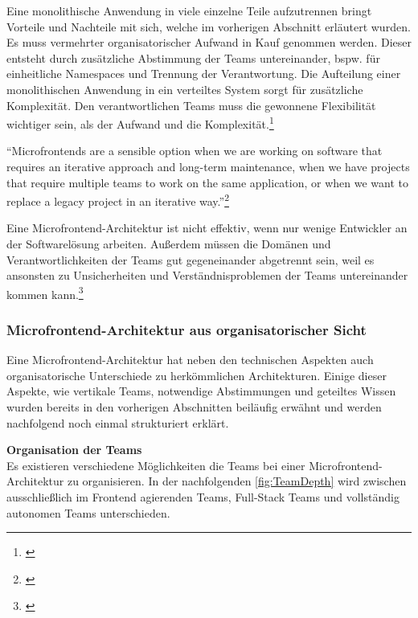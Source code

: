 Eine monolithische Anwendung in viele einzelne Teile aufzutrennen bringt Vorteile und Nachteile mit sich, welche im vorherigen Abschnitt erläutert wurden. Es muss vermehrter organisatorischer Aufwand in Kauf genommen werden. Dieser entsteht durch zusätzliche Abstimmung der Teams untereinander, bspw. für einheitliche Namespaces und Trennung der Verantwortung. Die Aufteilung einer monolithischen Anwendung in ein verteiltes System sorgt für zusätzliche Komplexität. Den verantwortlichen Teams muss die gewonnene Flexibilität wichtiger sein, als der Aufwand und die Komplexität.\footnote{\cite[vgl.][20]{Geers2020}}

\enquote{Microfrontends are a sensible option when we are working on software that requires an iterative approach and long-term maintenance, when we have projects that require multiple teams to work on the same application, or when we want to replace a legacy project in an iterative way.}\footnote{\cite[][21]{Mezzalira2021}}

Eine Microfrontend-Architektur ist nicht effektiv, wenn nur wenige Entwickler an der Softwarelösung arbeiten. Außerdem müssen die Domänen und Verantwortlichkeiten der Teams gut gegeneinander abgetrennt sein, weil es ansonsten zu Unsicherheiten und Verständnisproblemen der Teams untereinander kommen kann.\footnote{\cite[vgl.][21]{Geers2020}}

\subsubsection{Microfrontend-Architektur aus organisatorischer Sicht}\label{sec:MicrofrontendArchitekturOrganisatorisch}

Eine Microfrontend-Architektur hat neben den technischen Aspekten auch organisatorische Unterschiede zu herkömmlichen Architekturen. Einige dieser Aspekte, wie vertikale Teams, notwendige Abstimmungen und geteiltes Wissen wurden bereits in den vorherigen Abschnitten beiläufig erwähnt und werden nachfolgend noch einmal strukturiert erklärt.

\textbf{Organisation der Teams}\\
Es existieren verschiedene Möglichkeiten die Teams bei einer Microfrontend-Architektur zu organisieren. In der nachfolgenden \cref{fig:TeamDepth} wird zwischen ausschließlich im Frontend agierenden Teams, Full-Stack Teams und vollständig autonomen Teams unterschieden.

